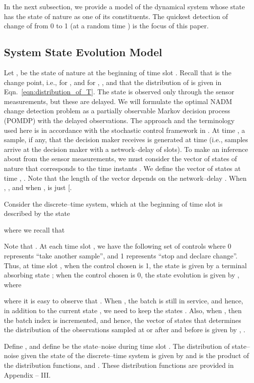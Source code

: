 \documentclass[acmtosn]{acmtrans2m}
\begin{document}
In the next subsection, we provide a model of the dynamical system whose
state has the state of nature  as one of its constituents. The
quickest detection of change of  from 0 to 1 (at a random
time ) is the focus of this paper.
 
\subsection{System State Evolution Model} 
\label{subsec:system-state-evolution-model} 
Let , be the state of nature at the
beginning of time slot . Recall that  is the change point, i.e.,
for ,  and for , , and that
the distribution of  is given in Eqn.~\ref{eqn:distribution_of_T}.
The state  is observed only through the sensor measurements,
but these are delayed. We will formulate the optimal {\sf NADM} change  
detection problem as a partially observable Markov decision process
(POMDP) with the delayed observations.
The approach and
the terminology used here is in accordance with the stochastic control
framework in \cite{books.bertsekas00a}. 
At time , a sample, if any,
that the decision maker receives is generated at time  (i.e., samples arrive at
the decision maker with a network--delay of 
slots). 
To make an inference about  from the
sensor measurements, we must consider the vector of states of nature 
that corresponds to the time instants . We define the vector of states at time , . Note that the length of the
vector depends on the network--delay . When ,
,
and when ,  is just [.



Consider the discrete--time
system, which at the beginning of time slot  is described by the
state  
 
where we recall that

Note that .
At each time slot , we have the following set of controls 
where 0 represents ``{\sf take another sample}'', and 1 represents
``{\sf stop and declare change}''.  Thus, at time slot , when the
control chosen is 1, the state  is given by a terminal
absorbing state ;  when the control chosen is 0, the state
evolution is given by , where 

where it is easy to observe that . When , the 
batch  is still in service, and hence, 
in addition to the current state , 
we need to keep the states   
. Also, when , then the batch index is incremented, and hence, 
the vector of states that determines the distribution of the observations 
sampled at or after  and before  is given by
, . 

Define , and define  
be the state--noise during time slot . 
The distribution of state--noise 
given the state of the discrete--time system  is given by \theta and
is  the product of the distribution functions, 
\theta and 
\theta. 
These distribution functions are provided in Appendix -- III. 
\end{document}
